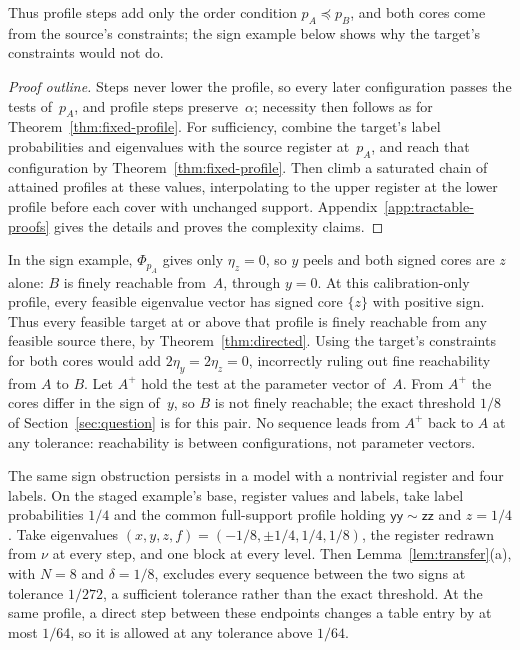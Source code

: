 Thus profile steps add only the order condition $p_A\preceq p_B$, and both
cores come from the source's constraints; the sign example below shows why
the target's constraints would not do.

\begin{proof}[Proof outline]
Steps never lower the profile, so every later configuration passes the
tests of~$p_A$, and profile steps preserve~$\alpha$; necessity then follows as
for Theorem~\ref{thm:fixed-profile}. For sufficiency, combine the target's
label probabilities and eigenvalues with the source register at~$p_A$, and
reach that configuration by Theorem~\ref{thm:fixed-profile}. Then climb a
saturated chain of attained profiles at these values, interpolating to the
upper register at the lower profile before each cover with unchanged
support. Appendix~\ref{app:tractable-proofs} gives the details and proves
the complexity claims.
\end{proof}

In the sign example, $\Phi_{p_A}$ gives only $\eta_z=0$, so $y$ peels and
both signed cores are $z$ alone: $B$ is finely reachable from~$A$, through
$y=0$. At this calibration-only profile, every feasible eigenvalue vector
has signed core $\{z\}$ with positive sign. Thus every feasible target at
or above that profile is finely reachable from any feasible source there,
by Theorem~\ref{thm:directed}. Using the target's constraints for both cores would add
$2\eta_y=2\eta_z=0$, incorrectly ruling out fine reachability from $A$ to
$B$. Let $A^+$ hold the test at the parameter vector of~$A$. From $A^+$ the
cores differ in the sign of~$y$, so $B$ is not finely reachable; the exact
threshold $1/8$ of Section~\ref{sec:question} is for this pair. No
sequence leads from $A^+$ back to $A$ at any tolerance: reachability is
between configurations, not parameter vectors.

The same sign obstruction persists in a model with a nontrivial register and
four labels. On the staged example's base, register values and labels, take
label probabilities $1/4$ and the common full-support profile holding
$\mathsf{yy}\sim\mathsf{zz}$ and $z=1/4$. Take eigenvalues
$(x,y,z,f)=(-1/8,\pm1/4,1/4,1/8)$, the register redrawn from $\nu$ at every
step, and one block at every level. Then Lemma~\ref{lem:transfer}(a), with
$N=8$ and $\delta=1/8$, excludes every sequence between the two signs at
tolerance $1/272$, a sufficient tolerance rather than the exact threshold.
At the same profile, a direct step between these endpoints changes a table
entry by at most $1/64$, so it is allowed at any tolerance above $1/64$.

